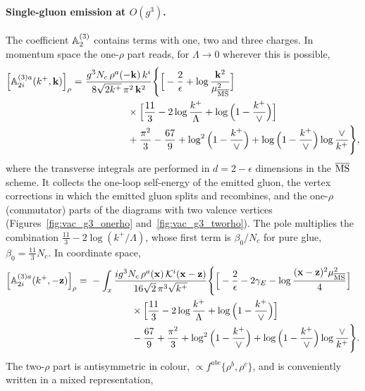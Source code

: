 \paragraph{Single-gluon emission at $O(g^3)$.} The coefficient $\mathbb{A}^{(3)}_2$ contains terms with one, two and three charges. In momentum space the one-$\rho$ part reads, for $\Lambda\to0$ wherever this is possible,
\begin{align}\label{eq:A3onerho}
\Big[\mf A^{(3)a}_{2i}(k^+,\v k)\Big]_{\rho}=\ &\frac{g^3N_c\,\rho^a(-\v k)\,k^i}{8\sqrt{2k^+}\,\pi^2\,\v k^2}\Bigg\{\Big[-\frac2\epsilon+\log\frac{\v k^2}{\mu^2_{\MS}}\Big]
\notag\\&\hspace{1.5cm}\times\Big[\frac{11}{3}-2\log\frac{k^+}{\Lambda}+\log\Big(1-\frac{k^+}{\vee}\Big)\Big]
\notag\\&\hspace{1.5cm}
+\frac{\pi^2}{3}-\frac{67}{9}+\log^2\Big(1-\frac{k^+}{\vee}\Big)+\log\Big(1-\frac{k^+}{\vee}\Big)\log\frac{\vee}{k^+}\Bigg\},
\end{align}
where the transverse integrals are performed in $d=2-\epsilon$ dimensions in the $\overline{\rm MS}$ scheme. It collects the one-loop self-energy of the emitted gluon, the vertex corrections in which the emitted gluon splits and recombines, and the one-$\rho$ (commutator) parts of the diagrams with two valence vertices (Figures~\ref{fig:vac_g3_onerho} and~\ref{fig:vac_g3_tworho}). The pole multiplies the combination $\frac{11}{3}-2\log(k^+/\Lambda)$, whose first term is $\beta_0/N_c$ for pure glue, $\beta_0=\frac{11}{3}N_c$. In coordinate space,
\begin{align}\label{eq:A3onerhoX}
\Big[\mf A^{(3)a}_{2i}(k^+,-\v z)\Big]_{\rho}=\ &-\int_x\frac{ig^3N_c\,\rho^a(\v x)\,\Kv^i(\v x-\v z)}{16\sqrt2\,\pi^3\sqrt{k^+}}\Bigg\{\Big[-\frac2\epsilon-2\gamma_E-\log\frac{(\v x-\v z)^2\mu^2_{\MS}}{4}\Big]
\notag\\&\hspace{1.5cm}\times\Big[\frac{11}{3}-2\log\frac{k^+}{\Lambda}+\log\Big(1-\frac{k^+}{\vee}\Big)\Big]
\notag\\&\hspace{1.5cm}
-\frac{67}{9}+\frac{\pi^2}{3}+\log^2\Big(1-\frac{k^+}{\vee}\Big)+\log\Big(1-\frac{k^+}{\vee}\Big)\log\frac{\vee}{k^+}\Bigg\}.
\end{align}
The two-$\rho$ part is antisymmetric in colour, $\propto f^{abc}\{\rho^b,\rho^c\}$, and is conveniently written in a mixed representation,
